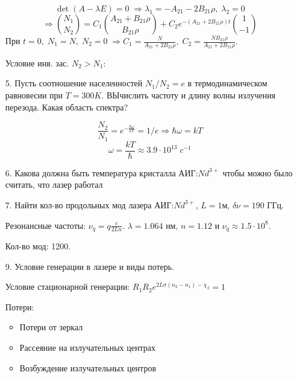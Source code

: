 \documentclass[a4paper]{article}
\begin{document}
\begin{itemize}
		$$\det{(A-\lambda E)} = 0\; \Rightarrow \lambda_1 = - A_{21} - 2 B_{21}\rho,\; \lambda_2 = 0$$
		$$\Rightarrow \binom{N_1}{N_2} = C_1 \binom{A_{21} + B_{21} \rho}{B_{21}\rho} + C_2 e^{-(A_{21} + 2B_{21} \rho)t} \binom{1}{-1} $$
		При $t=0,\; N_1=N,\; N_2=0\; \Rightarrow C_1 = \frac{N}{A_{21} + 2B_{21}\rho},\; C_2 = \frac{NB_{21}\rho}{A_{21} + 2B_{21}\rho}$. \par 
		Условие инв. зас. $N_2 > N_1:$ \par 
		\begin{center}
		\end{center}
		\begin{center}
		\end{center}

	\item[5.] Пусть соотношение населенностей $N_1/N_2 = e$ в термодинамическом равновесии при $T=300K$. ВЫчислить частоту и длину волны излучения перезода. Какая область спектра? \par 
		$$\frac{N_2}{N_1} = e^{-\frac{\hbar \omega}{kT}} = 1/e \Rightarrow \hbar \omega = kT$$
		$$\omega = \frac{kT}{\hbar} \approx 3.9 \cdot 10^{13}\; c^{-1}$$
		\begin{center}
		\end{center}

	\item[6.] Какова должна быть температура кристалла АИГ:$Nd^{3+}$ чтобы можно было считать, что лазер работал 

	\item[7.] Найти кол-во продольных мод лазера АИГ:$Nd^{3+}$, $L = 1$м, $\delta \nu =  190$ ГГц. \par 
		Резонансные частоты: $\nu_q = q \frac{c}{2Ln}$. $\lambda = 1.064$ нм, $n = 1.12$ и $\nu_q \approx 1.5 \cdot 10^8$.\par 
		Кол-во мод: 1200.

	\item[9.] Условие генерации в лазере и виды потерь. \par 
		Условие стационарной генерации: $R_1R_2 e^{2L\sigma(n_2-n_1)-\chi_2} = 1$ \par 
		Потери: 
		\begin{itemize}
			\item Потери от зеркал
			\item Рассеяние на излучательных центрах
			\item Возбуждение излучательных центров
		\end{itemize}


\end{itemize}
\end{document}

